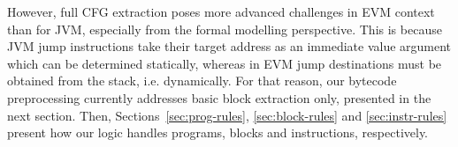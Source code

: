 \documentclass[sigplan,10pt]{acmart}\settopmatter{printfolios=true,printccs=false,printacmref=false}
\newcommand{\ttrip}[5]{\mathit{#1} \vdash_{\mathrm{#2}}[#3]\:#4\:[#5]}
\begin{document}
However, full CFG extraction poses more advanced challenges in EVM context than for JVM,
especially from the formal modelling perspective.
This is because JVM jump instructions
take their target address as an immediate value argument which can be determined statically,
whereas in EVM jump destinations
must be obtained from the stack, i.e. dynamically. For that reason, our bytecode preprocessing
currently addresses basic block extraction only, presented in the next section.
Then, Sections~\ref{sec:prog-rules}, \ref{sec:block-rules} and \ref{sec:instr-rules} 
present how our logic handles programs, blocks and instructions, respectively. 
%
%       
%
%
\end{document}
